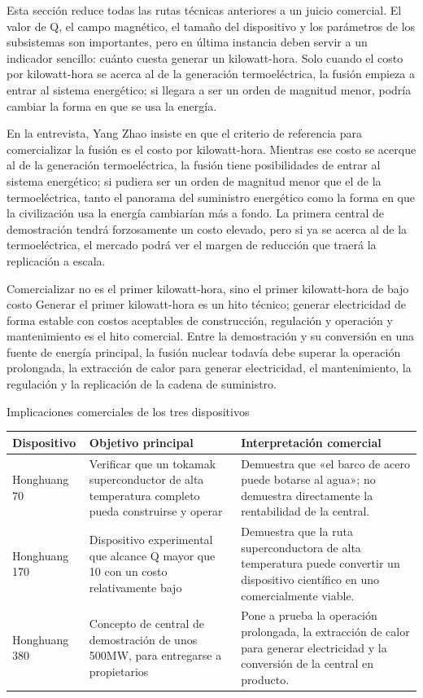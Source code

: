 \documentclass[a4paper]{article}
\begin{document}
Esta sección reduce todas las rutas técnicas anteriores a un juicio comercial. El valor de Q, el campo magnético, el tamaño del dispositivo y los parámetros de los subsistemas son importantes, pero en última instancia deben servir a un indicador sencillo: cuánto cuesta generar un kilowatt-hora. Solo cuando el costo por kilowatt-hora se acerca al de la generación termoeléctrica, la fusión empieza a entrar al sistema energético; si llegara a ser un orden de magnitud menor, podría cambiar la forma en que se usa la energía.

En la entrevista, Yang Zhao insiste en que el criterio de referencia para comercializar la fusión es el costo por kilowatt-hora. Mientras ese costo se acerque al de la generación termoeléctrica, la fusión tiene posibilidades de entrar al sistema energético; si pudiera ser un orden de magnitud menor que el de la termoeléctrica, tanto el panorama del suministro energético como la forma en que la civilización usa la energía cambiarían más a fondo. La primera central de demostración tendrá forzosamente un costo elevado, pero si ya se acerca al de la termoeléctrica, el mercado podrá ver el margen de reducción que traerá la replicación a escala.

\begin{importantbox}{Comercializar no es el primer kilowatt-hora, sino el primer kilowatt-hora de bajo costo}
Generar el primer kilowatt-hora es un hito técnico; generar electricidad de forma estable con costos aceptables de construcción, regulación y operación y mantenimiento es el hito comercial. Entre la demostración y su conversión en una fuente de energía principal, la fusión nuclear todavía debe superar la operación prolongada, la extracción de calor para generar electricidad, el mantenimiento, la regulación y la replicación de la cadena de suministro.
\end{importantbox}

\begin{knowledgebox}{Implicaciones comerciales de los tres dispositivos}
\begin{tabularx}{\textwidth}{p{}p{}X}
\toprule
Dispositivo & Objetivo principal & Interpretación comercial \\
\midrule
Honghuang 70 & Verificar que un tokamak superconductor de alta temperatura completo pueda construirse y operar & Demuestra que «el barco de acero puede botarse al agua»; no demuestra directamente la rentabilidad de la central. \\
Honghuang 170 & Dispositivo experimental que alcance Q mayor que 10 con un costo relativamente bajo & Demuestra que la ruta superconductora de alta temperatura puede convertir un dispositivo científico en uno comercialmente viable. \\
Honghuang 380 & Concepto de central de demostración de unos 500MW, para entregarse a propietarios & Pone a prueba la operación prolongada, la extracción de calor para generar electricidad y la conversión de la central en producto. \\
\bottomrule
\end{tabularx}
\end{knowledgebox}
\end{document}
